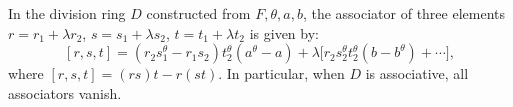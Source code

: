 In the division ring $D$ constructed from $F, \theta, a, b$, the associator of three elements $r = r_1 + \lambda r_2$, $s = s_1 + \lambda s_2$, $t = t_1 + \lambda t_2$ is given by:
\[
[r, s, t] = (r_2 s_1^\theta - r_1 s_2) t_2^\theta (a^\theta - a) + \lambda \big[ r_2 s_2^\theta t_2^\theta (b - b^\theta) + \cdots \big],
\]
where $[r,s,t] = (rs)t - r(st)$. In particular, when $D$ is associative, all associators vanish.